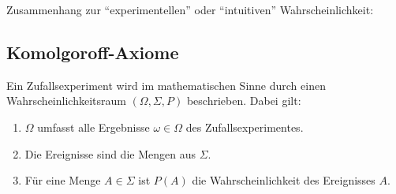 Zusammenhang zur ``experimentellen'' oder ``intuitiven'' Wahrscheinlichkeit:

\subsection{Komolgoroff-Axiome}
Ein Zufallsexperiment wird im mathematischen Sinne durch einen Wahrscheinlichkeitsraum $(\Omega,\Sigma,P)$ beschrieben. Dabei gilt:
\begin{enumerate}
 \item $\Omega$ umfasst alle Ergebnisse $\omega \in \Omega$ des Zufallsexperimentes.
 \item Die Ereignisse sind die Mengen aus $\Sigma$.
 \item Für eine Menge $A \in \Sigma$ ist $P(A)$ die Wahrscheinlichkeit des Ereignisses $A$.
\end{enumerate}

